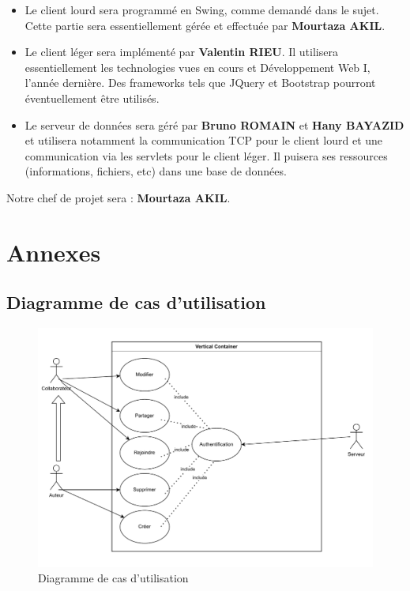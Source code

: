 	\begin{itemize}

		\item Le client lourd sera programmé en Swing, comme demandé dans le sujet. Cette partie sera essentiellement gérée et effectuée par \textbf{Mourtaza AKIL}.
		
		\item Le client léger sera implémenté par \textbf{Valentin RIEU}. Il utilisera essentiellement les technologies vues en cours et Développement Web I, l'année dernière. Des frameworks tels que JQuery et Bootstrap pourront éventuellement être utilisés.
		
		\item Le serveur de données sera géré par \textbf{Bruno ROMAIN} et \textbf{Hany BAYAZID} et utilisera notamment la communication TCP pour le client lourd et une communication via les servlets pour le client léger. Il puisera ses ressources (informations, fichiers, etc) dans une base de données.
	
	\end{itemize}
	
	Notre chef de projet sera : \textbf{Mourtaza AKIL}.
	
	\newpage	
	
	\section{Annexes}
	\appendix
	
	\subsection{Diagramme de cas d'utilisation}

	\begin{figure}[hb]
		\centering

		\includegraphics[scale=.3]{setup/diagramme_de_cas.png}
	\caption{Diagramme de cas d'utilisation}	
	\end{figure}
	\newpage
	

